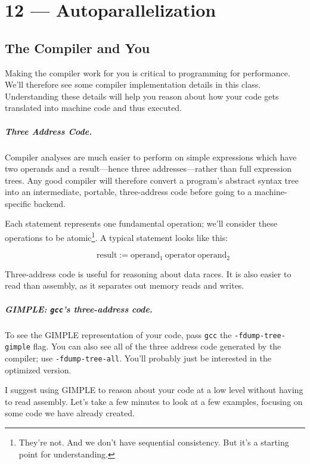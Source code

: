 \documentclass[a4paper]{report}
\begin{document}
\chapter*{12 --- Autoparallelization}


\section*{The Compiler and You}
Making the compiler work for you is critical to programming for
performance. We'll therefore see some compiler implementation details
in this class. Understanding these details will help you reason about
how your code gets translated into machine code and thus executed.

\paragraph{Three Address Code.} Compiler analyses are much easier to
perform on simple expressions which have two operands and a
result---hence three addresses---rather than full expression trees.
Any good compiler will therefore convert a program's abstract syntax
tree into an intermediate, portable, three-address code before going
to a machine-specific backend.

Each statement represents one fundamental operation; we'll consider
these operations to be atomic\footnote{They're not. And we don't have sequential consistency. But it's a starting point for understanding.}. A typical statement looks like this:

\[ \qquad \mbox{result} := \mbox{operand$_1$}\:\mbox{operator}\:\mbox{operand$_2$} \]

Three-address code is useful for reasoning about data races. It is
also easier to read than assembly, as it separates out memory reads
and writes.

\paragraph{GIMPLE: \texttt{gcc}'s three-address code.} To see the GIMPLE representation 
of your code, pass {\tt gcc} the {\tt -fdump-tree-gimple} flag. You
can also see all of the three address code generated by the compiler;
use {\tt -fdump-tree-all}. You'll probably just be interested in the
optimized version.  

I suggest using GIMPLE to reason about your code at a low level
without having to read assembly. Let's take a few minutes to look at a few examples, focusing on some code we have already created.
\end{document}
